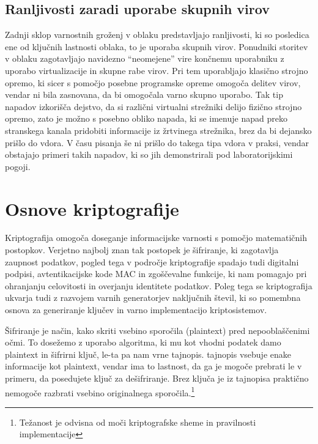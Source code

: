 \documentclass[12pt,a4paper,openany,tikz]{book}
\theoremstyle{plain}
\theoremstyle{definition}
\begin{document}
\section{Ranljivosti zaradi uporabe skupnih virov}
\label{sub:Ranljivosti zaradi uporabe skupnih virov}

Zadnji sklop varnostnih groženj v oblaku predstavljajo ranljivosti, ki so posledica ene od ključnih lastnosti oblaka, to je uporaba skupnih virov. Ponudniki storitev v oblaku zagotavljajo navidezno ``neomejene'' vire končnemu uporabniku z uporabo virtualizacije in skupne rabe virov. Pri tem uporabljajo klasično strojno opremo, ki sicer s pomočjo posebne programske opreme omogoča delitev virov, vendar ni bila zasnovana, da bi omogočala varno skupno uporabo. Tak tip napadov izkorišča dejstvo, da si različni virtualni strežniki delijo fizično strojno opremo, zato je možno s posebno obliko napada, ki se imenuje napad preko stranskega kanala pridobiti informacije iz žrtvinega strežnika, brez da bi dejansko prišlo do vdora. V času pisanja še ni prišlo do takega tipa vdora v praksi, vendar obstajajo primeri takih napadov, ki so jih demonstrirali pod laboratorijskimi pogoji.

\cleardoublepage
\chapter{Osnove kriptografije}

Kriptografija omogoča doseganje informacijske varnosti s pomočjo matematičnih postopkov. Verjetno najbolj znan tak postopek je šifriranje, ki zagotavlja zaupnost podatkov, pogled tega v področje kriptografije spadajo tudi digitalni podpisi, avtentikacijske kode MAC in zgoščevalne funkcije, ki nam pomagajo pri ohranjanju celovitosti in overjanju identitete podatkov. Poleg tega se kriptografija ukvarja tudi z razvojem varnih generatorjev naključnih števil, ki so pomembna osnova za generiranje ključev in varno implementacijo kriptosistemov.

Šifriranje je način, kako skriti vsebino sporočila (\gls{plaintext}) pred nepooblaščenimi očmi. To dosežemo z uporabo algoritma, ki mu kot vhodni podatek damo \gls{plaintext} in šifrirni ključ, le-ta pa nam vrne \gls{tajnopis}. \Gls{tajnopis} vsebuje enake informacije kot \gls{plaintext}, vendar ima to lastnost, da ga je mogoče prebrati le v primeru, da posedujete ključ za dešifriranje. Brez ključa je iz \gls{tajnopis}a praktično nemogoče razbrati vsebino originalnega sporočila.\footnote{Težanost je odvisna od moči kriptografske sheme in pravilnosti implementacije}
\end{document}
